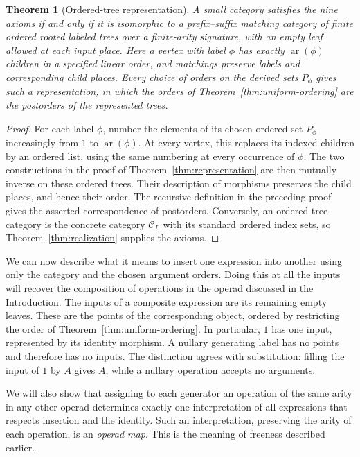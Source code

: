 \documentclass[11pt,a4paper]{article}
\theoremstyle{plain}
\newtheorem{theorem}{Theorem}[section]
\theoremstyle{definition}
\theoremstyle{remark}
\newcommand{\C}{\mathcal C}
\newcommand{\one}{1}
\begin{document}
\begin{theorem}[Ordered-tree representation]\label{cor:ordered-representation}
A small category satisfies the nine axioms if and only if it is
isomorphic to a prefix--suffix matching category of finite ordered
rooted labeled trees over a finite-arity signature, with an empty
leaf allowed at each input place. Here a vertex with label $\phi$
has exactly $\operatorname{ar}(\phi)$ children in a specified linear
order, and matchings preserve labels and corresponding child places.
Every choice of orders on the derived sets $P_\phi$ gives such a
representation, in which the orders of
Theorem~\ref{thm:uniform-ordering} are the postorders of the
represented trees.
\end{theorem}
\begin{proof}
For each label $\phi$, number the elements of its chosen ordered
set $P_\phi$ increasingly from $1$ to $\operatorname{ar}(\phi)$. At every vertex, this replaces its indexed
children by an ordered list, using the same numbering at every
occurrence of $\phi$. The two constructions in the proof of
Theorem~\ref{thm:representation} are then mutually inverse on these
ordered trees. Their description of morphisms preserves the child
places, and hence their order. The recursive definition in the
preceding proof gives the asserted correspondence of postorders.
Conversely, an ordered-tree category is the concrete category
$\C_L$ with its standard ordered index sets, so
Theorem~\ref{thm:realization} supplies the axioms.
\end{proof}

We can now describe what it means to insert one expression into
another using only the category and the chosen argument orders.
Doing this at all the inputs will recover the composition of
operations in the operad discussed in the Introduction. The inputs
of a composite expression are its remaining
empty leaves. These are the points of the corresponding object,
ordered by restricting the order of Theorem~\ref{thm:uniform-ordering}.
In particular, $\one$ has one input, represented by its identity
morphism. A nullary generating label has no points and therefore
has no inputs. The distinction agrees with substitution: filling
the input of $\one$ by $A$ gives $A$, while a nullary operation
accepts no arguments.

We will also show that assigning to each generator an operation of
the same arity in any other operad determines exactly one interpretation of all expressions
that respects insertion and the identity. Such an interpretation,
preserving the arity of each operation, is an \emph{operad map}.
This is the meaning of freeness described earlier.
\end{document}

